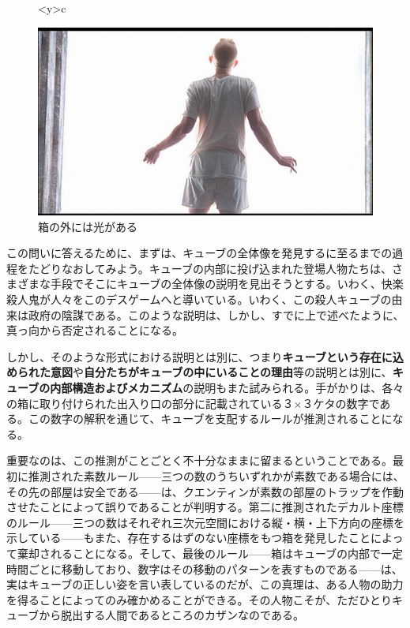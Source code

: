 \documentclass[b5j,twoside,twocolumn]{utarticle}
\begin{document}
\begin{figure}[h]
\begin{tabular}<y>{c}
\begin{minipage}[c]{0.65\hsize}
\centering
\includegraphics[scale=0.1]{光}
\caption{箱の外には光がある}
\end{minipage}
\end{tabular}
\end{figure}

この問いに答えるために、まずは、キューブの全体像を発見するに至るまでの過程をたどりなおしてみよう。キューブの内部に投げ込まれた登場人物たちは、さまざまな手段でそこにキューブの全体像の説明を見出そうとする。いわく、快楽殺人鬼が人々をこのデスゲームへと導いている。いわく、この殺人キューブの由来は政府の陰謀である。このような説明は、しかし、すでに上で述べたように、真っ向から否定されることになる。

しかし、そのような形式における説明とは別に、つまり\textbf{キューブという存在に込められた意図}や\textbf{自分たちがキューブの中にいることの理由}等の説明とは別に、\textbf{キューブの内部構造およびメカニズム}の説明もまた試みられる。手がかりは、各々の箱に取り付けられた出入り口の部分に記載されている３×３ケタの数字である。この数字の解釈を通じて、キューブを支配するルールが推測されることになる。

重要なのは、この推測がことごとく不十分なままに留まるということである。最初に推測された素数ルール------三つの数のうちいずれかが素数である場合には、その先の部屋は安全である------は、クエンティンが素数の部屋のトラップを作動させたことによって誤りであることが判明する。第二に推測されたデカルト座標のルール------三つの数はそれぞれ三次元空間における縦・横・上下方向の座標を示している------もまた、存在するはずのない座標をもつ箱を発見したことによって棄却されることになる。そして、最後のルール------箱はキューブの内部で一定時間ごとに移動しており、数字はその移動のパターンを表すものである------は、実はキューブの正しい姿を言い表しているのだが、この真理は、ある人物の助力を得ることによってのみ確かめることができる。その人物こそが、ただひとりキューブから脱出する人間であるところのカザンなのである。
\end{document}
